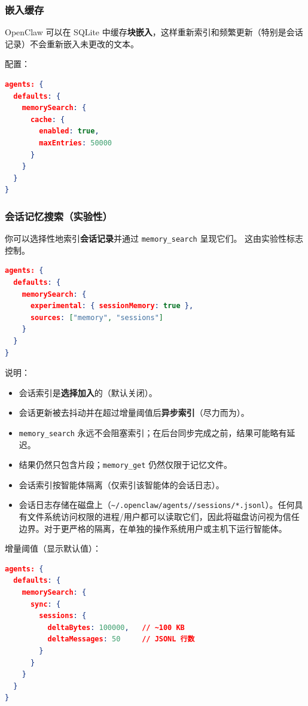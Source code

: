 \subsubsection{嵌入缓存}


OpenClaw 可以在 SQLite 中缓存\textbf{块嵌入}，这样重新索引和频繁更新（特别是会话记录）不会重新嵌入未更改的文本。

配置：

\begin{lstlisting}[language=json]
agents: {
  defaults: {
    memorySearch: {
      cache: {
        enabled: true,
        maxEntries: 50000
      }
    }
  }
}
\end{lstlisting}


\subsubsection{会话记忆搜索（实验性）}


你可以选择性地索引\textbf{会话记录}并通过 \texttt{memory\_search} 呈现它们。
这由实验性标志控制。

\begin{lstlisting}[language=json]
agents: {
  defaults: {
    memorySearch: {
      experimental: { sessionMemory: true },
      sources: ["memory", "sessions"]
    }
  }
}
\end{lstlisting}


说明：

\begin{itemize}
  \item 会话索引是\textbf{选择加入}的（默认关闭）。
  \item 会话更新被去抖动并在超过增量阈值后\textbf{异步索引}（尽力而为）。
  \item \texttt{memory\_search} 永远不会阻塞索引；在后台同步完成之前，结果可能略有延迟。
  \item 结果仍然只包含片段；\texttt{memory\_get} 仍然仅限于记忆文件。
  \item 会话索引按智能体隔离（仅索引该智能体的会话日志）。
  \item 会话日志存储在磁盘上（\texttt{\textasciitilde{}/.openclaw/agents//sessions/*.jsonl}）。任何具有文件系统访问权限的进程/用户都可以读取它们，因此将磁盘访问视为信任边界。对于更严格的隔离，在单独的操作系统用户或主机下运行智能体。
\end{itemize}


增量阈值（显示默认值）：

\begin{lstlisting}[language=json]
agents: {
  defaults: {
    memorySearch: {
      sync: {
        sessions: {
          deltaBytes: 100000,   // ~100 KB
          deltaMessages: 50     // JSONL 行数
        }
      }
    }
  }
}
\end{lstlisting}


